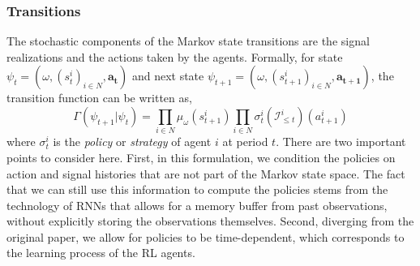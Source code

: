 \subsubsection*{Transitions}
The stochastic components of the Markov state transitions are the signal realizations and the actions taken by the agents. Formally, for state 
$\psi_t = (\omega, (s^i_t)_{i \in N}, \bm{a_t})$ and next state ${}\psi_{t+1} = (\omega, (s^i_{t+1})_{i \in N}, \bm{a_{t+1}} )$, the transition function can be written as,
\begin{equation*}
    \Gamma(\psi_{t+1}|\psi_t) = \prod_{i \in N} \mu_{\omega}(s^i_{t+1}) \prod_{i \in N} \sigma_t^i(\mathcal{I}^i_{\leq t})(a^i_{t+1})
\end{equation*}
where $\sigma_t^i$ is the \textit{policy} or \textit{strategy} of agent $i$ at period $t$. There are two important points to consider here. First, in this formulation, we condition the policies on action and signal histories that are not part of the Markov state space. The fact that we can still use this information to compute the policies stems from the technology of RNNs that allows for a memory buffer from past observations, without explicitly storing the observations themselves. Second, diverging from the original paper, we allow for policies to be time-dependent, which corresponds to the learning process of the RL agents.
